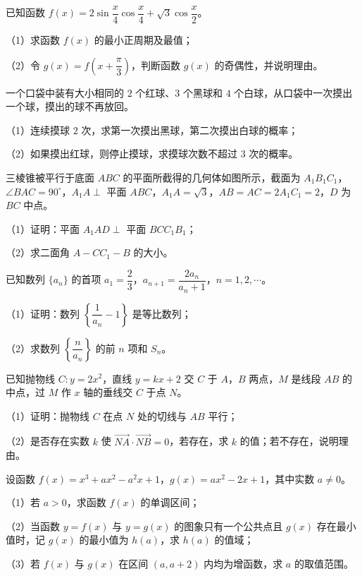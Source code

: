 \begin{question}
已知函数 $f(x)=2\sin\dfrac x4\cos\dfrac x4+\sqrt3\cos\dfrac x2$。

（1）求函数 $f(x)$ 的最小正周期及最值；

（2）令 $g(x)=f\left(x+\dfrac{\pi}3\right)$，判断函数 $g(x)$ 的奇偶性，并说明理由。

\end{question}
\begin{question}
一个口袋中装有大小相同的 $2$ 个红球、$3$ 个黑球和 $4$ 个白球，从口袋中一次摸出一个球，摸出的球不再放回。

（1）连续摸球 $2$ 次，求第一次摸出黑球，第二次摸出白球的概率；

（2）如果摸出红球，则停止摸球，求摸球次数不超过 $3$ 次的概率。

\Needspace{0.4\textheight}
\end{question}
\begin{question}
三棱锥被平行于底面 $ABC$ 的平面所截得的几何体如图所示，截面为 $A_1B_1C_1$，$\angle BAC=90^\circ$，$A_1A\perp$ 平面 $ABC$，$A_1A=\sqrt3$，$AB=AC=2A_1C_1=2$，$D$ 为 $BC$ 中点。

（1）证明：平面 $A_1AD\perp$ 平面 $BCC_1B_1$；

（2）求二面角 $A-CC_1-B$ 的大小。
\nopagebreak[4]
\begin{center}\end{center}
\nopagebreak[4]
\end{question}
\begin{question}
已知数列 $\{a_n\}$ 的首项 $a_1=\dfrac23$，$a_{n+1}=\dfrac{2a_n}{a_n+1}$，$n=1,2,\cdots$。

（1）证明：数列 $\left\{\dfrac1{a_n}-1\right\}$ 是等比数列；

（2）求数列 $\left\{\dfrac n{a_n}\right\}$ 的前 $n$ 项和 $S_n$。

\end{question}
\begin{question}
已知抛物线 $C:y=2x^2$，直线 $y=kx+2$ 交 $C$ 于 $A$，$B$ 两点，$M$ 是线段 $AB$ 的中点，过 $M$ 作 $x$ 轴的垂线交 $C$ 于点 $N$。

（1）证明：抛物线 $C$ 在点 $N$ 处的切线与 $AB$ 平行；

（2）是否存在实数 $k$ 使 $\overrightarrow{NA}\cdot\overrightarrow{NB}=0$，若存在，求 $k$ 的值；若不存在，说明理由。

\end{question}
\begin{question}
设函数 $f(x)=x^3+ax^2-a^2x+1$，$g(x)=ax^2-2x+1$，其中实数 $a\neq0$。

（1）若 $a>0$，求函数 $f(x)$ 的单调区间；

（2）当函数 $y=f(x)$ 与 $y=g(x)$ 的图象只有一个公共点且 $g(x)$ 存在最小值时，记 $g(x)$ 的最小值为 $h(a)$，求 $h(a)$ 的值域；

（3）若 $f(x)$ 与 $g(x)$ 在区间 $(a,a+2)$ 内均为增函数，求 $a$ 的取值范围。

\end{question}